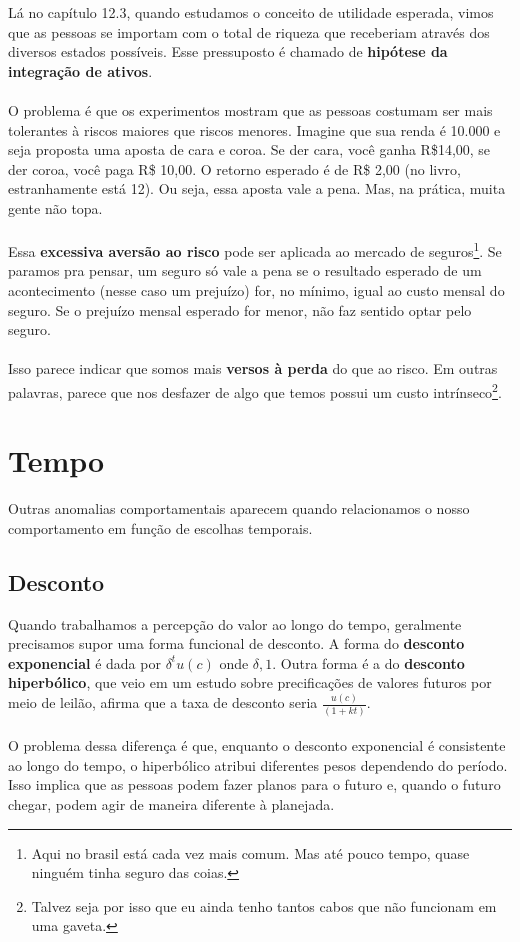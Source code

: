 \documentclass[a4paper,11pt,oneside]{book}
\theoremstyle{definition}
\theoremstyle{break}
\begin{document}
Lá no capítulo 12.3, quando estudamos o conceito de utilidade esperada, vimos que as pessoas se importam com o total de riqueza que receberiam através dos diversos estados possíveis. Esse pressuposto é chamado de \textbf{hipótese da integração de ativos}.
\\~\\
O problema é que os experimentos mostram que as pessoas costumam ser mais tolerantes à riscos maiores que riscos menores. Imagine que sua renda é 10.000 e  seja proposta uma aposta de cara e coroa. Se der cara, você ganha R\$14,00, se der coroa, você paga R\$ 10,00. O retorno esperado é de R\$ 2,00 (no livro, estranhamente está 12). Ou seja, essa aposta vale a pena. Mas, na prática, muita gente não topa.
\\~\\
Essa \textbf{excessiva aversão ao risco} pode ser aplicada ao mercado de seguros\footnote{Aqui no brasil está cada vez mais comum. Mas até pouco tempo, quase ninguém tinha seguro das coias.}. Se paramos pra pensar, um seguro só vale a pena se o resultado esperado de um acontecimento (nesse caso um prejuízo) for, no mínimo, igual ao custo mensal do seguro. Se o prejuízo mensal esperado for menor, não faz sentido optar pelo seguro.
\\~\\
Isso parece indicar que somos mais \textbf{versos à perda} do que ao risco. Em outras palavras, parece que nos desfazer de algo que temos possui um custo intrínseco\footnote{Talvez seja por isso que eu ainda tenho tantos cabos que não funcionam em uma gaveta.}.

\section{Tempo}

Outras anomalias comportamentais aparecem quando relacionamos o nosso comportamento em função de escolhas temporais.

\subsection{Desconto}

Quando trabalhamos a percepção do valor ao longo do tempo, geralmente precisamos supor uma forma funcional de desconto. A forma do \textbf{desconto exponencial} é dada por $\delta^t u(c)$ onde $\delta , 1$. Outra forma é a do \textbf{desconto hiperbólico}, que veio em um estudo sobre precificações de valores futuros por meio de leilão, afirma que a taxa de desconto seria $\frac{u(c)}{(1+kt)}$.
\\~\\
O problema dessa diferença é que, enquanto o desconto exponencial é consistente ao longo do tempo, o hiperbólico atribui diferentes pesos dependendo do período. Isso implica que as pessoas podem fazer planos para o futuro e, quando o futuro chegar, podem agir de maneira diferente à planejada.
\end{document}
